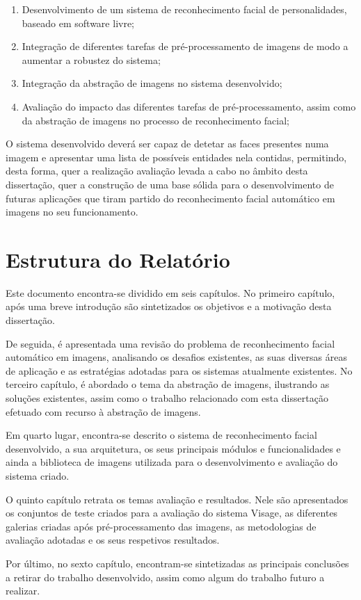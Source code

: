 \begin{enumerate}
\item Desenvolvimento de um sistema de reconhecimento facial de personalidades, baseado em software livre;
\item Integração de diferentes tarefas de pré-processamento de imagens de modo a aumentar a robustez do sistema;
\item Integração da abstração de imagens no sistema desenvolvido;
\item Avaliação do impacto das diferentes tarefas de pré-processamento, assim como da abstração de imagens no processo de reconhecimento facial;
\end{enumerate}

O sistema desenvolvido deverá ser capaz de detetar as faces presentes numa imagem e apresentar uma lista de possíveis entidades nela contidas, permitindo, desta forma, quer a realização avaliação levada a cabo no âmbito desta dissertação, quer a construção de uma base sólida para o desenvolvimento de futuras aplicações que tiram partido do reconhecimento facial automático em imagens no seu funcionamento.

\section{Estrutura do Relatório} \label{sec:struct}
Este documento encontra-se dividido em seis capítulos. No primeiro capítulo, após uma breve introdução são sintetizados os objetivos e a motivação desta dissertação.

De seguida, é apresentada uma revisão do problema de reconhecimento facial automático em imagens, analisando os desafios existentes, as suas diversas áreas de aplicação e as estratégias adotadas para os sistemas atualmente existentes. No terceiro capítulo, é abordado o tema da abstração de imagens, ilustrando as soluções existentes, assim como o trabalho relacionado com esta dissertação efetuado com  recurso à abstração de imagens.

Em quarto lugar, encontra-se descrito o sistema de reconhecimento facial desenvolvido, a sua arquitetura, os seus principais módulos e funcionalidades e ainda a biblioteca de imagens utilizada para o desenvolvimento e avaliação do sistema criado.

O quinto capítulo retrata os temas avaliação e resultados. Nele são apresentados os conjuntos de teste criados para a avaliação do sistema Visage, as diferentes galerias criadas após pré-processamento das imagens, as metodologias de avaliação adotadas e os seus respetivos resultados.

Por último, no sexto capítulo, encontram-se sintetizadas as principais conclusões a retirar do trabalho desenvolvido, assim como algum do trabalho futuro a realizar.